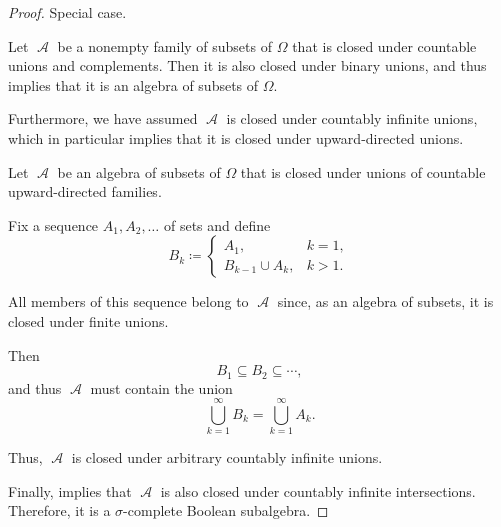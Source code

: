 \begin{proof}
   Special case.

   Let \( \mscrA \) be a nonempty family of subsets of \( \Omega \) that is closed under countable unions and complements. Then it is also closed under binary unions, and thus  implies that it is an algebra of subsets of \( \Omega \).

  Furthermore, we have assumed \( \mscrA \) is closed under countably infinite unions, which in particular implies that it is closed under upward-directed unions.

   Let \( \mscrA \) be an algebra of subsets of \( \Omega \) that is closed under unions of countable upward-directed families.

  Fix a sequence \( A_1, A_2, \ldots \) of sets and define
  \begin{equation*}
    B_k \coloneqq \begin{cases}
      A_1,              &k = 1, \\
      B_{k-1} \cup A_k, &k > 1.
    \end{cases}
  \end{equation*}

  All members of this sequence belong to \( \mscrA \) since, as an algebra of subsets, it is closed under finite unions.

  Then
  \begin{equation*}
    B_1 \subseteq B_2 \subseteq \cdots,
  \end{equation*}
  and thus \( \mscrA \) must contain the union
  \begin{equation*}
    \bigcup_{k=1}^\infty B_k = \bigcup_{k=1}^\infty A_k.
  \end{equation*}

  Thus, \( \mscrA \) is closed under arbitrary countably infinite unions.

  Finally,  implies that \( \mscrA \) is also closed under countably infinite intersections. Therefore, it is a \( \sigma \)-complete Boolean subalgebra.
\end{proof}

